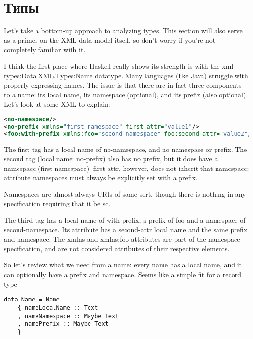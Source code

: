 \section{Типы} %

Let's take a bottom-up approach to analyzing types. This section will also serve as a primer on the XML data model itself, so don't worry if you're not completely familiar with it.

I think the first place where Haskell really shows its strength is with the xml-types:Data.XML.Types:Name datatype. Many languages (like Java) struggle with properly expressing names. The issue is that there are in fact three components to a name: its local name, its namespace (optional), and its prefix (also optional). Let's look at some XML to explain:

\begin{lstlisting}[language=XML]
<no-namespace/>
<no-prefix xmlns="first-namespace" first-attr="value1"/>
<foo:with-prefix xmlns:foo="second-namespace" foo:second-attr="value2"/>
\end{lstlisting}

The first tag has a local name of no-namespace, and no namespace or prefix. The second tag (local name: no-prefix) also has no prefix,  but it does have a namespace (first-namespace). first-attr, however, does not inherit that namespace: attribute namespaces must always be explicitly set with a prefix.

\begin{remark}
Namespaces are almost always URIs of some sort, though there is nothing in any specification requiring that it be so.
\end{remark}

The third tag has a local name of with-prefix, a prefix of foo and a namespace of second-namespace. Its attribute has a second-attr local name and the same prefix and namespace. The xmlns and xmlns:foo attributes are part of the namespace
specification, and are not considered attributes of their respective elements.

So let's review what we need from a name: every name has a local name, and it can optionally have a prefix and namespace. Seems like a simple fit for a record type:

\begin{lstlisting}
data Name = Name
    { nameLocalName :: Text
    , nameNamespace :: Maybe Text
    , namePrefix :: Maybe Text
    }
\end{lstlisting}

